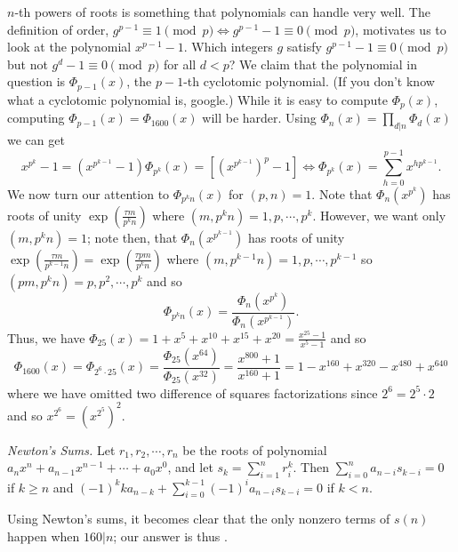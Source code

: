 \begin{solution}\hfil\medskip
	
	$n$-th powers of roots is something that polynomials can handle very well. The definition of order, $g^{p - 1} \equiv 1 \pmod{p} \iff g^{p - 1} - 1 \equiv 0 \pmod{p}$,
	motivates us to look at the polynomial $x^{p - 1} - 1$. Which integers $g$ satisfy $g^{p - 1} - 1 \equiv 0 \pmod{p}$ but not $g^d - 1 \equiv 0 \pmod{p}$ for all 
	$d < p$? We claim that the polynomial in question is $\Phi_{p - 1}(x)$, the $p - 1$-th cyclotomic polynomial. (If you don't know what a cyclotomic polynomial is, google.)
	While it is easy to compute $\Phi_p(x)$, computing $\Phi_{p - 1}(x) = \Phi_{1600}(x)$ will be harder. Using $\Phi_n(x) = \prod_{d|n} \Phi_d(x)$ we can 
	get $$x^{p^k} - 1 = \left(x^{p^{k - 1}} - 1\right) \Phi_{p^k}(x) = \left[\left(x^{p^{k - 1}}\right)^p - 1\right] \iff \Phi_{p^k}(x) = \sum_{h = 0}^{p - 1} x^{hp^{k - 1}}.$$
	We now turn our attention to $\Phi_{p^kn}(x)$ for $(p, n) = 1$. Note that $\Phi_n\left(x^{p^k}\right)$ has roots of unity $\exp\left(\frac{\tau m}{p^kn}\right)$
	where $\left(m, p^kn\right) = 1, p, \cdots , p^k$. However, we want only $\left(m, p^kn\right) = 1$; note then, that $\Phi_n\left(x^{p^{k - 1}}\right)$ has roots of unity
	$\exp\left(\frac{\tau m}{p^{k - 1}n}\right) = \exp\left(\frac{\tau pm}{p^kn}\right)$ where $\left(m, p^{k - 1}n\right) = 1, p, \cdots , p^{k - 1}$ so $\left(pm, p^kn\right) = p, p^2, \cdots , p^k$
	and so $$\Phi_{p^kn}(x) = \dfrac{\Phi_n\left(x^{p^k}\right)}{\Phi_n\left(x^{p^{k - 1}}\right)}.$$
	Thus, we have $\Phi_{25}(x) = 1 + x^5 + x^{10} + x^{15} + x^{20} = \frac{x^{25} - 1}{x^5 - 1}$ and so 
	$$\Phi_{1600}(x) = \Phi_{2^6 \cdot 25}(x) = \dfrac{\Phi_{25}\left(x^{64}\right)}{\Phi_{25}\left(x^{32}\right)} = \dfrac{x^{800} + 1}{x^{160} + 1} = 1 - x^{160} + x^{320} - x^{480} + x^{640}$$
	where we have omitted two difference of squares factorizations since $2^6 = 2^5 \cdot 2$ and so $x^{2^6} = \left(x^{2^5}\right)^2$. \medskip

	\textit{Newton's Sums.} Let $r_1, r_2, \cdots , r_n$ be the roots of polynomial $a_nx^n + a_{n - 1}x^{n - 1} + \cdots + a_0x^0$, and let $s_k = \sum_{i = 1}^n r_i^k$.
	Then $\sum_{i = 0}^n a_{n - i}s_{k - i} = 0$ if $k \geq n$ and $(-1)^kka_{n - k} + \sum_{i = 0}^{k - 1} (-1)^ia_{n - i}s_{k - i} = 0$ if $k < n$. \medskip

	Using Newton's sums, it becomes clear that the only nonzero terms of $s(n)$ happen when $160|n$; our answer is thus .
\end{solution}\bigskip
